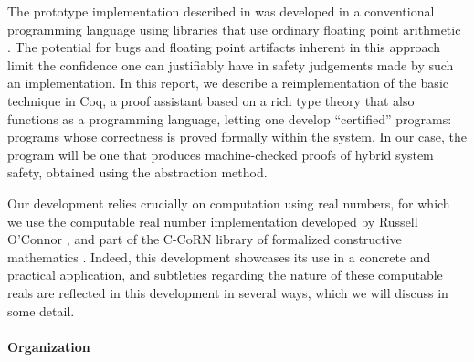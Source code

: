 \documentclass[runningheads]{llncs}
\begin{document}
The prototype implementation described in \cite{alur} was developed in a conventional programming language using libraries that use ordinary floating point arithmetic . The potential for bugs and floating point artifacts inherent in this approach limit the confidence one can justifiably have in safety judgements made by such an implementation. In this report, we describe a reimplementation of the basic technique in Coq, a proof assistant based on a rich type theory that also functions as a programming language, letting one develop ``certified'' programs: programs whose correctness is proved formally within the system. In our case, the program will be one that produces machine-checked proofs of hybrid system safety, obtained using the abstraction method.

Our development relies crucially on computation using real numbers, for which we use the computable real number implementation developed by Russell O'Connor \cite{something}, and part of the C-CoRN library of formalized constructive mathematics \cite{something}. Indeed, this development showcases its use in a concrete and practical application, and subtleties regarding the nature of these computable reals are reflected in this development in several ways, which we will discuss in some detail.









\paragraph{Organization}
\end{document}
